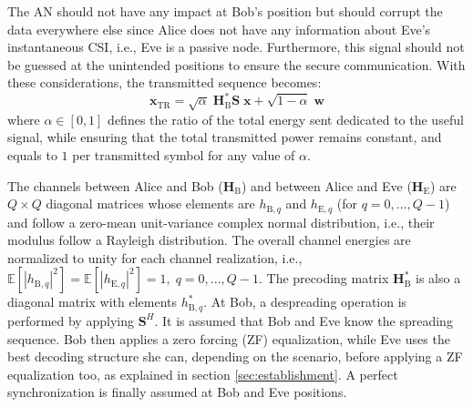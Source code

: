 \documentclass[journal,comsoc]{IEEEtran}
\newcommand{\HE}{\textbf{H}_{\text{E}}}
\newcommand{\HB}{\textbf{H}_{\text{B}}}
\newcommand{\spread}{\textbf{S}}
\newcommand{\w}{\textbf{w}}
\newcommand{\mat}[1]{\boldsymbol{\mathrm{#1}}}
\begin{document}
The AN should not have any impact at Bob's position but should corrupt the data everywhere else since Alice does not have any information about Eve's instantaneous CSI, i.e., Eve is a passive node. Furthermore, this signal should not be guessed at the unintended positions to ensure the secure communication. With these considerations, the transmitted sequence becomes:
\begin{equation}
	\textbf{x}_{\text{TR}} = \sqrt{\alpha} \;\HB^*  \spread\; \textbf{x} +  \sqrt{1-\alpha} \; \w
	\label{eq:sym_rad_AN}
\end{equation} 
where $\alpha \in [0,1]$ defines the ratio of the total energy sent dedicated to the useful signal, while ensuring that the total transmitted power remains constant, and equals to $1$ per transmitted symbol for any value of $\alpha$.

The channels between Alice and Bob ($\HB$) and between Alice and Eve ($\HE$) are $Q\times Q$ diagonal matrices whose elements are $h_{\text{B},q}$ and $h_{\text{E},q}$ (for $q = 0,...,Q-1$) and follow a zero-mean unit-variance complex normal distribution, i.e., their modulus follow a Rayleigh distribution. The overall channel energies are normalized to unity for each channel realization, i.e., $\mathbb{E}\left[\left|h_{\text{B},q}\right|^2\right]  = \mathbb{E}\left[\left|h_{\text{E},q}\right|^2\right] = 1, \; q = 0,...,Q-1$. The precoding matrix $\HB^*$ is also a diagonal matrix with elements $h_{\text{B},q}^*$. At Bob, a despreading operation is performed by applying $\spread^H$. It is assumed that Bob and Eve know the spreading sequence. Bob then applies a zero forcing (ZF) equalization, while Eve uses the best decoding structure \mat{G} she can, depending on the scenario, before applying a ZF equalization too, as explained in section \ref{sec:establishment}. A perfect synchronization is finally assumed at Bob and Eve positions.\\







%
\end{document}

